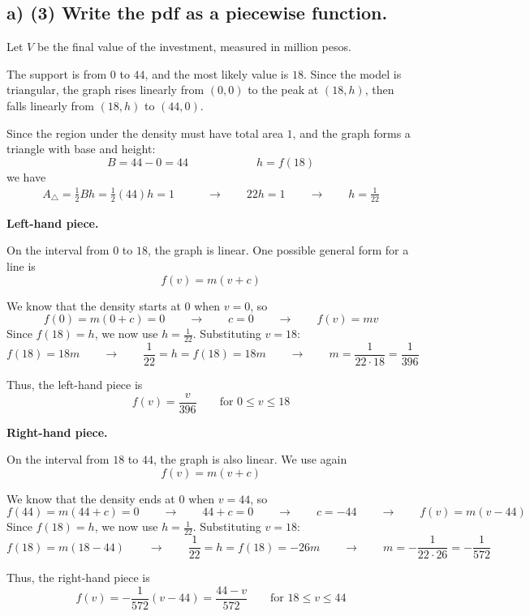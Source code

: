 \subsection*{a) \textbf{(3)} Write the pdf as a piecewise function.}
\label{subsec:small-business-investment-c3-a}
Let $V$ be the final value of the investment, measured in million pesos.

The support is from $0$ to $44$, and the most likely value is $18$. Since the model is triangular, the graph rises linearly from $(0,0)$ to the peak at $(18,h)$, then falls linearly from $(18,h)$ to $(44,0)$.

Since the region under the density must have total area \(1\), and the graph forms a triangle with base and height:
\[
B=44-0=44
\qquad \qquad \qquad
h=f(18)
\]
we have
\[
\begin{aligned}
	A_{\triangle}=\frac{1}{2}Bh
	=\frac{1}{2}(44)h
	=1
	&\qquad \longrightarrow \qquad
	22h=1
	\qquad \longrightarrow \qquad
	h=\frac{1}{22}
\end{aligned}
\]

\textbf{Left-hand piece.}

On the interval from $0$ to $18$, the graph is linear. One possible general form for a line is
\[
f(v)=m(v+c)
\]

We know that the density starts at $0$ when $v=0$, so
\[
f(0)=m(0+c)=0
\qquad \longrightarrow \qquad
c=0
\qquad \longrightarrow \qquad
f(v)=mv
\]
%
Since \(f(18)=h\), we now use \(h=\frac{1}{22}\). Substituting \(v=18\):
\[
f(18)=18m
\qquad \longrightarrow \qquad
\frac{1}{22}=h=f(18)=18m
\qquad \longrightarrow \qquad
m=\frac{1}{22\cdot 18}=\frac{1}{396}
\]

Thus, the left-hand piece is
\[
f(v)=\frac{v}{396}
\qquad \text{for }0\le v\le 18
\]

\textbf{Right-hand piece.}

On the interval from $18$ to $44$, the graph is also linear. We use again
\[
f(v)=m(v+c)
\]

We know that the density ends at $0$ when \(v=44\), so
\[
f(44)=m(44+c)=0
\qquad \longrightarrow \qquad
44+c=0
\qquad \longrightarrow \qquad
c=-44
\qquad \longrightarrow \qquad
f(v)=m(v-44)
\]
%
Since \(f(18)=h\), we now use \(h=\frac{1}{22}\). Substituting \(v=18\):
\[
f(18)=m(18-44)
\qquad \longrightarrow \qquad
\frac{1}{22}=h=f(18)=-26m
\qquad \longrightarrow \qquad
m=-\frac{1}{22\cdot 26}=-\frac{1}{572}
\]

Thus, the right-hand piece is
\[
f(v)=-\frac{1}{572}(v-44)=\frac{44-v}{572}
\qquad \text{for }18\le v\le 44
\]

